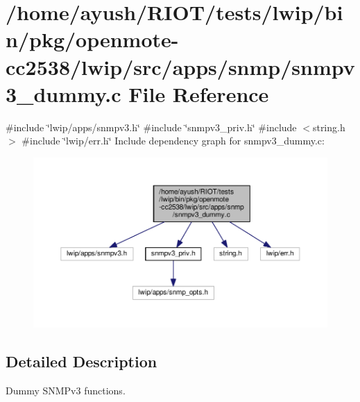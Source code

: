 \hypertarget{openmote-cc2538_2lwip_2src_2apps_2snmp_2snmpv3__dummy_8c}{}\section{/home/ayush/\+R\+I\+O\+T/tests/lwip/bin/pkg/openmote-\/cc2538/lwip/src/apps/snmp/snmpv3\+\_\+dummy.c File Reference}
\label{openmote-cc2538_2lwip_2src_2apps_2snmp_2snmpv3__dummy_8c}
{\ttfamily \#include \char`\"{}lwip/apps/snmpv3.\+h\char`\"{}}\newline
{\ttfamily \#include \char`\"{}snmpv3\+\_\+priv.\+h\char`\"{}}\newline
{\ttfamily \#include $<$string.\+h$>$}\newline
{\ttfamily \#include \char`\"{}lwip/err.\+h\char`\"{}}\newline
Include dependency graph for snmpv3\+\_\+dummy.\+c\+:
\nopagebreak
\begin{figure}[H]
\begin{center}
\leavevmode
\includegraphics[width=350pt]{openmote-cc2538_2lwip_2src_2apps_2snmp_2snmpv3__dummy_8c__incl}
\end{center}
\end{figure}


\subsection{Detailed Description}
Dummy S\+N\+M\+Pv3 functions. 